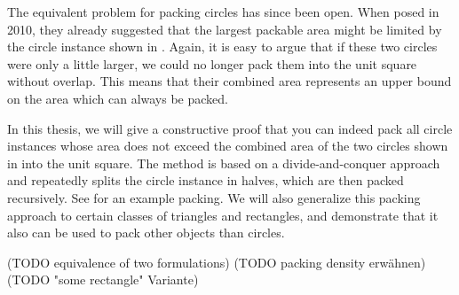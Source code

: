 \documentclass[a4paper,style=print,oneside,bibliography=totoc,nexus,lnum,extramargin]{tubsbook}
\begin{document}

The equivalent problem for packing circles has since been open.
When \textcite{DFL2010circle} posed  in 2010, they already suggested that the largest packable area might be limited by the circle instance shown in . Again, it is easy to argue that if these two circles were only a little larger, we could no longer pack them into the unit square without overlap. This means that their combined area represents an upper bound on the area which can always be packed.


In this thesis, we will give a constructive proof that you can indeed pack all circle instances whose area does not exceed the combined area of the two circles shown in  into the unit square.
The method is based on a divide-and-conquer approach and repeatedly splits the circle instance in halves, which are then packed recursively.
See  for an example packing.
We will also generalize this packing approach to certain classes of triangles and rectangles, and demonstrate that it also can be used to pack other objects than circles.


(TODO equivalence of two formulations)
(TODO packing density erwähnen)
(TODO "some rectangle" Variante)




\end{document}
